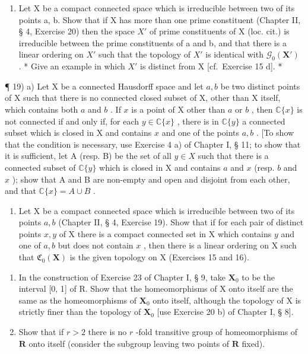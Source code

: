 \begin{enumerate}
\def\labelenumi{\alph{enumi})}
\setcounter{enumi}{1}
\tightlist
\item
  Let X be a compact connected space which is irreducible between two of its points a, b. Show that if X has more than one prime constituent (Chapter II, § 4, Exercise 20) then the space \(X'\) of prime constituents of X (loc. cit.) is irreducible between the prime constituents of a and b, and that there is a linear ordering on \(X'\) such that the topology of \(X'\) is identical with \(\mathcal{G}_{0}(\mathbf{X}')\) . * Give an example in which \(X'\) is distinct from X {[}cf.~Exercise 15 d{]}. *
\end{enumerate}

¶ 19) a) Let X be a connected Hausdorff space and let \(a, b\) be two distinct points of X such that there is no connected closed subset of X, other than X itself, which contains both \(a\) and \(b\) . If \(x\) is a point of X other than \(a\) or \(b\) , then \(\mathbb{C}\{x\}\) is not connected if and only if, for each \(y \in \mathbb{C}\{x\}\) , there is in \(\mathbb{C}\{y\}\) a connected subset which is closed in X and contains \(x\) and one of the points \(a, b\) . {[}To show that the condition is necessary, use Exercise 4 a) of Chapter I, § 11; to show that it is sufficient, let A (resp. B) be the set of all \(y \in X\) such that there is a connected subset of \(\mathbb{C}\{y\}\) which is closed in X and contains \(a\) and \(x\) (resp. \(b\) and \(x\) ); show that A and B are non-empty and open and disjoint from each other, and that \(\mathbb{C}\{x\} = A \cup B\) .

\begin{enumerate}
\def\labelenumi{\alph{enumi})}
\setcounter{enumi}{1}
\tightlist
\item
  Let X be a compact connected space which is irreducible between two of its points \(a, b\) (Chapter II, § 4, Exercise 19). Show that if for each pair of distinct points \(x, y\) of X there is a compact connected set in X which contains \(y\) and one of \(a, b\) but does not contain \(x\) , then there is a linear ordering on X such that \(\mathfrak{C}_{0}(\mathbf{X})\) is the given topology on X (Exercises 15 and 16).
\end{enumerate}

\begin{enumerate}
\def\labelenumi{\arabic{enumi})}
\setcounter{enumi}{19}
\item
  In the construction of Exercise 23 of Chapter I, § 9, take \(\mathbf{X}_0\) to be the interval {[}0, 1{]} of R. Show that the homeomorphisms of X onto itself are the same as the homeomorphisms of \(\mathbf{X}_0\) onto itself, although the topology of X is strictly finer than the topology of \(\mathbf{X}_0\) {[}use Exercise 20 b) of Chapter I, § 8{]}.
\item
  Show that if \(r > 2\) there is no \(r\) -fold transitive group of homeomorphisms of \(\mathbf{R}\) onto itself (consider the subgroup leaving two points of \(\mathbf{R}\) fixed).
\end{enumerate}

